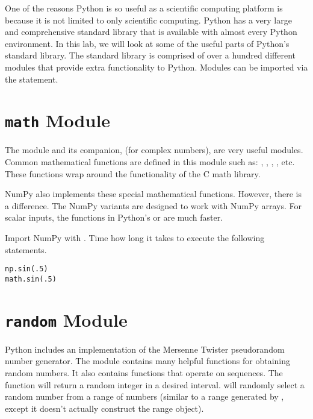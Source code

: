 
One of the reasons Python is so useful as a scientific computing platform is because
it is not limited to only scientific computing.  Python has a very large and comprehensive standard library that is available with almost every Python environment.
In this lab, we will look at some of the useful parts of Python's standard library.  The standard library is comprised of over a hundred different modules that provide extra functionality to Python.
Modules can be imported via the  statement.

\section*{\texttt{math} Module}
The  module and its companion,  (for complex numbers), are very useful modules.
Common mathematical functions are defined in this module such as: , , , , etc.  These functions wrap around the functionality of the C math library.

\begin{problem}
NumPy also implements these special mathematical functions.  However, there is a difference.
The NumPy variants are designed to work with NumPy arrays.  For scalar inputs, the functions
in Python's  or  are much faster.

Import NumPy with .  Time how long it takes to execute the following statements.
\begin{lstlisting}
np.sin(.5)
math.sin(.5)
\end{lstlisting}
\end{problem}

\section*{\texttt{random} Module}
Python includes an implementation of the Mersenne Twister pseudorandom number generator.
The  module contains many helpful functions for obtaining random numbers.  It also contains functions that operate on sequences.
The  function will return a random integer in a desired interval.  
 will randomly select a random number from a range of numbers (similar to a range generated by , except it doesn't actually construct the range object).

